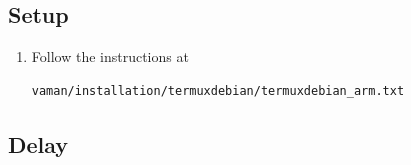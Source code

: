 \documentclass[journal,12pt,twocolumn]{IEEEtran}
\renewcommand\thesection{\arabic{section}}
\renewcommand\thesubsection{\thesection.\arabic{subsection}}
\begin{document}
\subsection{Setup}
\renewcommand{\theequation}{\theenumi}
\renewcommand{\thefigure}{\theenumi}
\begin{enumerate}[label=\thesubsection.\arabic*.,ref=\thesubsection.\theenumi]
\item Follow the instructions at
\begin{lstlisting}
vaman/installation/termuxdebian/termuxdebian_arm.txt
\end{lstlisting}

\end{enumerate}
%
\subsection{Delay}
\end{document}
